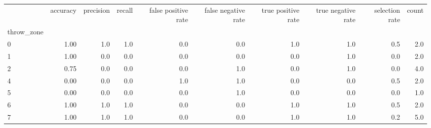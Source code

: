\begin{tabular}{lrrrrrrrrr}
\toprule
{} &  accuracy &  precision &  recall &  false positive rate &  false negative rate &  true positive rate &  true negative rate &  selection rate &  count \\
throw\_zone &           &            &         &                      &                      &                     &                     &                 &        \\
\midrule
0          &      1.00 &        1.0 &     1.0 &                  0.0 &                  0.0 &                 1.0 &                 1.0 &             0.5 &    2.0 \\
1          &      1.00 &        0.0 &     0.0 &                  0.0 &                  0.0 &                 0.0 &                 1.0 &             0.0 &    2.0 \\
2          &      0.75 &        0.0 &     0.0 &                  0.0 &                  1.0 &                 0.0 &                 1.0 &             0.0 &    4.0 \\
4          &      0.00 &        0.0 &     0.0 &                  1.0 &                  1.0 &                 0.0 &                 0.0 &             0.5 &    2.0 \\
5          &      0.00 &        0.0 &     0.0 &                  0.0 &                  1.0 &                 0.0 &                 0.0 &             0.0 &    1.0 \\
6          &      1.00 &        1.0 &     1.0 &                  0.0 &                  0.0 &                 1.0 &                 1.0 &             0.5 &    2.0 \\
7          &      1.00 &        1.0 &     1.0 &                  0.0 &                  0.0 &                 1.0 &                 1.0 &             0.2 &    5.0 \\
\bottomrule
\end{tabular}
